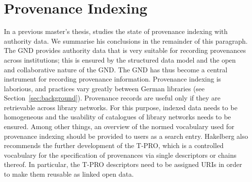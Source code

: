 %
%
%
%
%
%
\section{Provenance Indexing}
\label{sec:provenance_indexing}

In a previous master's thesis, \textcite{Hakelberg2016}
studies the state of provenance indexing with authority data.
We summarise his conclusions in the remainder of this paragraph.
The \gls{GND} provides authority data that is
very suitable for recording provenances across institutions;
this is ensured by the structured data model
and the open and collaborative nature of the \gls{GND}.
The \gls{GND} has thus become a central instrument for recording
provenance information.
Provenance indexing is laborious, and
practices vary greatly between German libraries (see Section~\ref{sec:background}).
Provenance records are useful only if
they are retrievable across library networks.
For this purpose, indexed data needs to be homogeneous
and the usability of catalogues of library networks needs to be ensured.
Among other things, an overview
of the normed vocabulary used for provenance indexing
should be provided to users as a search entry.
Hakelberg also recommends the further development of the \gls{T-PRO},
which is a controlled vocabulary
for the specification of provenances via single descriptors or chains thereof.
In particular, the T-PRO descriptors need to be assigned \glspl{URI}
in order to make them reusable as linked open data. %

